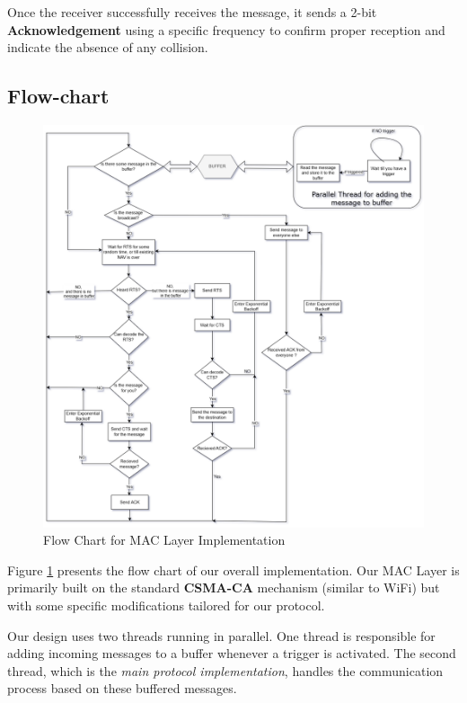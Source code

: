 \documentclass[a4paper,12pt]{article}
\begin{document}
Once the receiver successfully receives the message, it sends a 2-bit \textbf{Acknowledgement} using a specific frequency to confirm proper reception and indicate the absence of any collision.

\subsection{Flow-chart}
\begin{figure}
    \centering    \includegraphics[width=\textwidth]{fig.png}
    \caption{Flow Chart for MAC Layer Implementation}
    \label{1}
\end{figure}

Figure \ref{1} presents the flow chart of our overall implementation. Our MAC Layer is primarily built on the standard \textbf{CSMA-CA} mechanism (similar to WiFi) but with some specific modifications tailored for our protocol.

Our design uses two threads running in parallel. One thread is responsible for adding incoming messages to a buffer whenever a trigger is activated. The second thread, which is the \textit{main protocol implementation}, handles the communication process based on these buffered messages.
\end{document}
